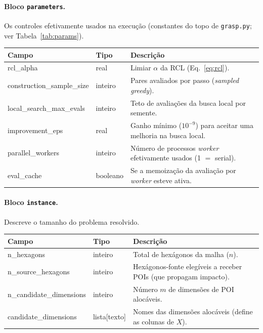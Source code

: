\documentclass[11pt,a4paper]{article}
\begin{document}
\paragraph{Bloco \texttt{parameters}.} Os controles efetivamente usados na
execução (constantes do topo de \texttt{grasp.py}; ver Tabela~\ref{tab:params}).
\begin{center}\small
\begin{tabular}{@{}>{\ttfamily}l l p{7.8cm}@{}}
\toprule
\normalfont Campo & \normalfont Tipo & \normalfont Descrição \\
\midrule
rcl\_alpha                 & real      & Limiar $\alpha$ da RCL (Eq.~\ref{eq:rcl}). \\
construction\_sample\_size & inteiro   & Pares avaliados por passo (\emph{sampled greedy}). \\
local\_search\_max\_evals  & inteiro   & Teto de avaliações da busca local por semente. \\
improvement\_eps           & real      & Ganho mínimo ($10^{-9}$) para aceitar uma melhoria na busca local. \\
parallel\_workers          & inteiro   & Número de processos \emph{worker} efetivamente usados (1 $=$ serial). \\
eval\_cache                & booleano  & Se a memoização da avaliação por \emph{worker} esteve ativa. \\
\bottomrule
\end{tabular}
\end{center}

\paragraph{Bloco \texttt{instance}.} Descreve o tamanho do problema resolvido.
\begin{center}\small
\begin{tabular}{@{}>{\ttfamily}l l p{7.8cm}@{}}
\toprule
\normalfont Campo & \normalfont Tipo & \normalfont Descrição \\
\midrule
n\_hexagons          & inteiro     & Total de hexágonos da malha ($n$). \\
n\_source\_hexagons  & inteiro     & Hexágonos-fonte elegíveis a receber POIs (que propagam impacto). \\
n\_candidate\_dimensions & inteiro & Número $m$ de dimensões de POI alocáveis. \\
candidate\_dimensions & lista[texto] & Nomes das dimensões alocáveis (define as colunas de $X$). \\
\bottomrule
\end{tabular}
\end{center}
\end{document}
